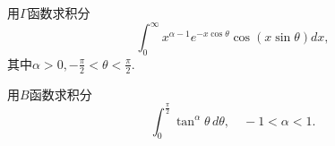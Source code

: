 \documentclass[10pt]{article}
\newenvironment{problem}[2][]{\begin{trivlist}
\item[\hskip \labelsep {\bfseries #1}\hskip \labelsep {\bfseries #2}]}{\end{trivlist}}
\begin{document}
\begin{problem}{7.6}
  用$\Gamma$函数求积分
  $$
  \int_0^\infty x^{\alpha -1 } e^{-x \cos{\theta}} \cos\left( x \sin{\theta} \right) dx,
  $$
  其中$\alpha > 0, -\frac{\pi}{2} < \theta < \frac{\pi}{2}$.
\end{problem} 

\begin{problem}{7.7}
  用$B$函数求积分
  $$
  \int_0^{\frac{\pi}{2}} \tan^\alpha{\theta} \,  d\theta, \quad  -1 < \alpha < 1.
  $$
\end{problem} 
\end{document}
